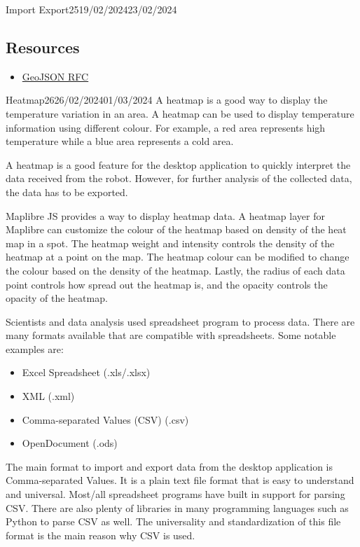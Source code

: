 \documentclass[12pt]{article}
\begin{document}
\begin{logbook-entry}{Import Export}{25}{19/02/2024}{23/02/2024}
\subsection*{Resources}

\begin{itemize}
    \item \href{https://datatracker.ietf.org/doc/html/rfc7946}{GeoJSON RFC}
\end{itemize}

\end{logbook-entry}

\begin{logbook-entry}{Heatmap}{26}{26/02/2024}{01/03/2024}
A heatmap is a good way to display the temperature variation in an area.
A heatmap can be used to display temperature information using different colour.
For example, a red area represents high temperature while a blue area represents a cold area.

A heatmap is a good feature for the desktop application to quickly interpret the data received from the robot.
However, for further analysis of the collected data, the data has to be exported.

Maplibre JS provides a way to display heatmap data.
A heatmap layer for Maplibre can customize the colour of the heatmap based on density of the heat map in a spot.
The heatmap weight and intensity controls the density of the heatmap at a point on the map.
The heatmap colour can be modified to change the colour based on the density of the heatmap.
Lastly, the radius of each data point controls how spread out the heatmap is, and the opacity controls the opacity of the heatmap.

Scientists and data analysis used spreadsheet program to process data.
There are many formats available that are compatible with spreadsheets.
Some notable examples are:

\begin{itemize}
    \item Excel Spreadsheet (.xls/.xlsx)
    \item XML (.xml)
    \item Comma-separated Values (CSV) (.csv)
    \item OpenDocument (.ods)
\end{itemize}

The main format to import and export data from the desktop application is Comma-separated Values.
It is a plain text file format that is easy to understand and universal.
Most/all spreadsheet programs have built in support for parsing CSV.
There are also plenty of libraries in many programming languages such as Python to parse CSV as well.
The universality and standardization of this file format is the main reason why CSV is used.


\end{logbook-entry}
\end{document}
